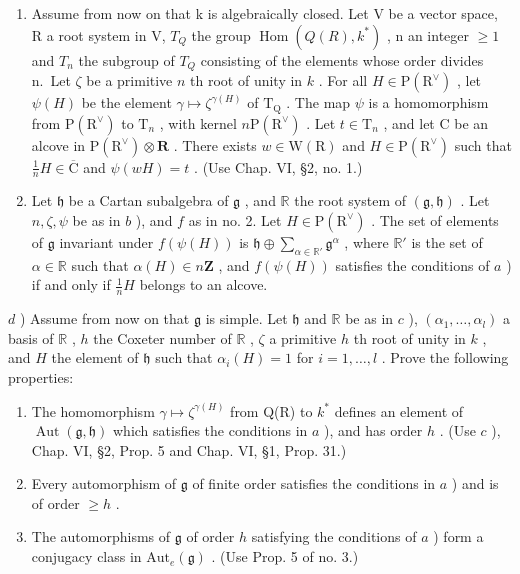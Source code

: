 \begin{enumerate}
\def\labelenumi{\alph{enumi})}
\setcounter{enumi}{1}
\item
  Assume from now on that k is algebraically closed. Let V be a vector space, R a root system in V, \(T_{Q}\) the group \(\operatorname{Hom}(Q(R), k^{*})\) , n an integer \(\geq 1\) and \(T_{n}\) the subgroup of \(T_{Q}\) consisting of the elements whose order divides n.~Let \(\zeta\) be a primitive \(n\) th root of unity in \(k\) . For all \(H \in \mathrm{P}(\mathrm{R}^{\vee})\) , let \(\psi(H)\) be the element \(\gamma \mapsto \zeta^{\gamma(H)}\) of \(\mathrm{T}_{\mathrm{Q}}\) . The map \(\psi\) is a homomorphism from \(\mathrm{P}(\mathrm{R}^{\vee})\) to \(\mathrm{T}_n\) , with kernel \(n\mathrm{P}(\mathrm{R}^{\vee})\) . Let \(t \in \mathrm{T}_n\) , and let \(\mathrm{C}\) be an alcove in \(\mathrm{P}(\mathrm{R}^{\vee}) \otimes \mathbf{R}\) . There exists \(w \in \mathrm{W}(\mathrm{R})\) and \(H \in \mathrm{P}(\mathrm{R}^{\vee})\) such that \(\frac{1}{n} H \in \overline{\mathrm{C}}\) and \(\psi(wH) = t\) . (Use Chap. VI, §2, no. 1.)
\item
  Let \(\mathfrak{h}\) be a Cartan subalgebra of \(\mathfrak{g}\) , and \(\mathbb{R}\) the root system of \((\mathfrak{g},\mathfrak{h})\) . Let \(n,\zeta ,\psi\) be as in \(b\) ), and \(f\) as in no. 2. Let \(H\in \mathrm{P}(\mathrm{R}^{\vee})\) . The set of elements of \(\mathfrak{g}\) invariant under \(f(\psi (H))\) is \(\mathfrak{h}\oplus \sum_{\alpha \in \mathbb{R}'}\mathfrak{g}^\alpha\) , where \(\mathbb{R}'\) is the set of \(\alpha \in \mathbb{R}\) such that \(\alpha (H)\in n\mathbf{Z}\) , and \(f(\psi (H))\) satisfies the conditions of \(a\) ) if and only if \(\frac{1}{n} H\) belongs to an alcove.
\end{enumerate}

\(d\) ) Assume from now on that \(\mathfrak{g}\) is simple. Let \(\mathfrak{h}\) and \(\mathbb{R}\) be as in \(c\) ), \((\alpha_{1},\ldots ,\alpha_{l})\) a basis of \(\mathbb{R}\) , \(h\) the Coxeter number of \(\mathbb{R}\) , \(\zeta\) a primitive \(h\) th root of unity in \(k\) , and \(H\) the element of \(\mathfrak{h}\) such that \(\alpha_{i}(H) = 1\) for \(i = 1,\dots,l\) . Prove the following properties:

\begin{enumerate}
\def\labelenumi{(\roman{enumi})}
\item
  The homomorphism \(\gamma \mapsto \zeta^{\gamma (H)}\) from Q(R) to \(k^{*}\) defines an element of \(\operatorname {Aut}(\mathfrak{g},\mathfrak{h})\) which satisfies the conditions in \(a\) ), and has order \(h\) . (Use \(c\) ), Chap. VI, §2, Prop. 5 and Chap. VI, §1, Prop. 31.)
\item
  Every automorphism of \(\mathfrak{g}\) of finite order satisfies the conditions in \(a\) ) and is of order \(\geq h\) .
\item
  The automorphisms of \(\mathfrak{g}\) of order \(h\) satisfying the conditions of \(a\) ) form a conjugacy class in \(\mathrm{Aut}_e(\mathfrak{g})\) . (Use Prop. 5 of no. 3.)
\end{enumerate}

